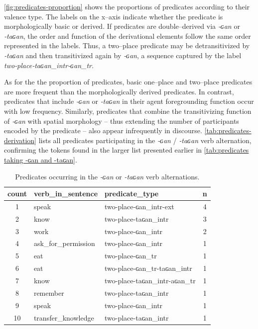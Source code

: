 \documentclass[12pt]{article}
\begin{document}
\autoref{fig:predicates-proportion} shows the proportions of predicates according to their valence type. The labels on the x--axis indicate whether the predicate is morphologically basic or derived. If predicates are double--derived via \textit{‑ɢan} or \textit{‑taɢan}, the order and function of the derivational elements follow the same order represented in the labels. Thus, a two--place predicate may be detransitivized by \textit{‑taɢan} and then transitivized again by \textit{‑ɢan}, a sequence captured by the label \textit{two‑place‑taɢan\_intr‑ɢan\_tr}.

As for the the proportion of predicates, basic one--place and two--place predicates are more frequent than the morphologically derived predicates. In contrast, predicates that include \textit{‑ɢan} or \textit{‑taɢan} in their agent foregrounding function occur with low frequency. Similarly, predicates that combine the transitivizing function of \textit{‑ɢan} with spatial morphology -- thus extending the number of participants encoded by the predicate -- also appear infrequently in discourse. \autoref{tab:predicates-derivation} lists all predicates participating in the \textit{‑ɢan} / \textit{‑taɢan} verb alternation, confirming the tokens found in the larger list presented earlier in \autoref{tab:predicates taking -ɢan and -taɢan}.

\begin{table}[H]
\centering
\caption{Predicates occurring in the \textit{-ɢan} or \textit{-taɢan} verb alternations.} 
\begin{tabular}{cllc}
  \hline \hline
 count & verb\_in\_sentence & predicate\_type & n \\ 
  \hline 
1 & speak & two-place-ɢan\_intr-ext &   4 \\ 
  2 & know & two-place-taɢan\_intr &   3 \\ 
  3 & work & two-place-ɢan\_intr &   2 \\ 
  4 & ask\_for\_permission & two-place-ɢan\_intr &   1 \\ 
  5 & eat & two-place-ɢan\_tr &   1 \\ 
  6 & eat & two-place-ɢan\_tr-taɢan\_intr &   1 \\ 
  7 & know & two-place-taɢan\_intr-aɢan\_tr &   1 \\ 
  8 & remember & two-place-taɢan\_intr &   1 \\ 
  9 & speak & two-place-ɢan\_intr &   1 \\ 
  10 & transfer\_knowledge & two-place-taɢan\_intr &   1 \\ 
   \hline \hline
\end{tabular}

\label{tab:predicates-derivation}
\end{table}
\end{document}

